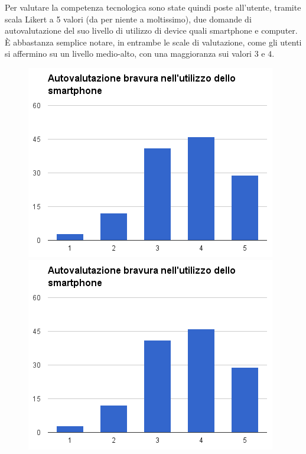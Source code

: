 Per valutare la competenza tecnologica sono state quindi poste all'utente,
tramite scala Likert a 5 valori (da per niente a moltissimo),
due domande di autovalutazione del suo livello di utilizzo di device
quali smartphone e computer.
\\
È abbastanza semplice notare, in entrambe le scale di valutazione,
come gli utenti si affermino su un livello
medio-alto, con una maggioranza sui valori $3$ e $4$.
\begin{figure}[H]
\centering
\begin{minipage}{.48\textwidth}
	\includegraphics[scale=0.45]{img/chart_bravura_smartphone}
\end{minipage}
\hfill
\begin{minipage}{.49\textwidth}
	\includegraphics[scale=0.45]{img/chart_bravura_smartphone}
\end{minipage}
\end{figure}


